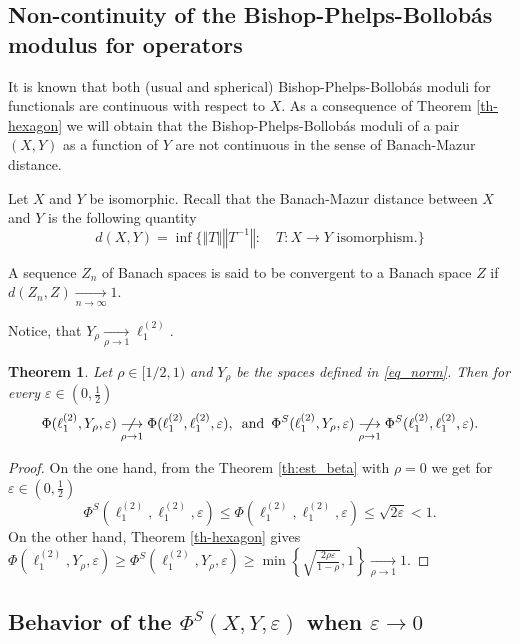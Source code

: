 \documentclass[11pt,a4paper]{amsart}
\newcommand{\eps}{\varepsilon}
\newcommand{\norm}[1]{\left\Vert#1\right\Vert}
\numberwithin{equation}{section}
\theoremstyle{plain}
\newtheorem{theorem}{Theorem}[section]
\theoremstyle{definition}
\renewcommand{\leq}{\leqslant}
\renewcommand{\geq}{\geqslant}
\begin{document}
\subsection{Non-continuity of the Bishop-Phelps-Bollob\'as modulus for operators}
It is known \cite[Theorem 3.3]{Modul2016} that both (usual and spherical) Bishop-Phelps-Bollob\'as moduli for functionals are continuous with respect to $X$.
As a consequence of Theorem \ref{th-hexagon} we will obtain that the  Bishop-Phelps-Bollob\'as moduli of a pair $(X, Y)$ as a function of $Y$ are not continuous in the sense of Banach-Mazur distance. 

Let $X$ and $Y$ be isomorphic. Recall that the Banach-Mazur distance between $X$ and $Y$ is the following quantity
$$d(X, Y) = \inf \{\norm{T}\norm{T^{-1}}:\quad T : X \rightarrow  Y  \text{ isomorphism}.\}$$ 

A sequence $Z_n$ of Banach spaces is said to be convergent to a Banach space $Z$ if $d(Z_n, Z) \underset{n \rightarrow \infty}{\longrightarrow }1.$

Notice, that $Y_\rho\underset{\rho\rightarrow 1}{\longrightarrow }\ell_1^{(2)}$.
\begin{theorem} \label{theor-non-contin}
Let $ \rho \in [1/2, 1)$ and $Y_\rho$ be the spaces defined in \eqref{eq_norm}. Then for every $\eps \in (0, \frac12)$ 
$$
\Phi(\ell_1^{(2)},Y_\rho,\varepsilon)\underset{\rho\rightarrow 1}{\centernot\longrightarrow}\Phi(\ell_1^{(2)},\ell_1^{(2)},\varepsilon), \, \mbox{ and } \, \Phi^S(\ell_1^{(2)},Y_\rho,\varepsilon)\underset{\rho\rightarrow 1}{\centernot\longrightarrow}\Phi^S(\ell_1^{(2)},\ell_1^{(2)},\varepsilon).
$$
\end{theorem}
\begin{proof}
On the one hand, from the Theorem \ref{th:est_beta} with $\rho=0$ we get for $\eps \in (0, \frac12)$ 
$$ \Phi^S(\ell_1^{(2)},\ell_1^{(2)},\varepsilon)\leq\Phi(\ell_1^{(2)},\ell_1^{(2)},\varepsilon)\leq \sqrt{2\eps} < 1.
$$
On the other hand, Theorem \ref{th-hexagon} gives $\Phi(\ell_1^{(2)},Y_\rho,\varepsilon)\geq \Phi^S(\ell_1^{(2)},Y_\rho,\varepsilon)\geq \min \left\lbrace\sqrt{\frac{2\rho\eps}{1-\rho}}, 1\right\rbrace \xrightarrow[\rho \to 1]{} 1$. 
\end{proof}

\subsection{Behavior of the $\Phi^S(X,Y,\varepsilon)$ when $\eps \rightarrow 0$} 
\end{document}
